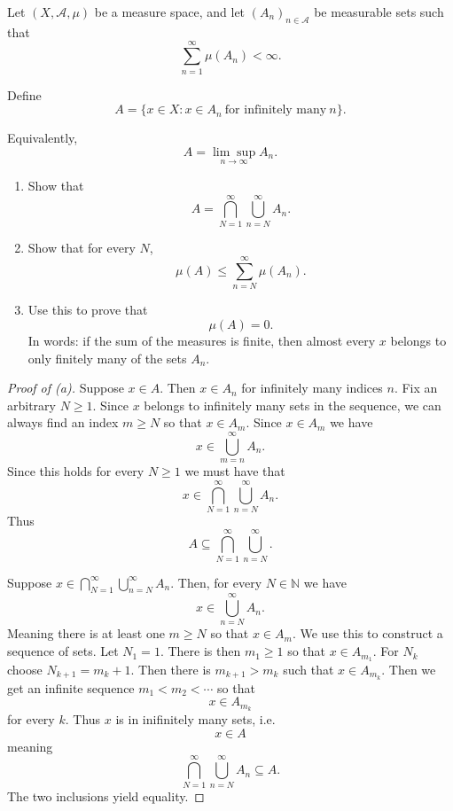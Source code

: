 \begin{prob}
    Let $(X,\mathcal A, \mu)$ be a measure space, and let 
    $(A_n)_{n\in\mathcal A}$ be measurable sets such that 
    \[
        \sum_{n=1}^\infty \mu(A_n) < \infty.
    \]
    
    Define 
    \[
        A = \{x \in X : x \in A_n \ \text{for infinitely many} \ 
        n\}.
    \]

    Equivalently, 
    \[
        A = \underset{n\to\infty}{\lim\sup}A_n.
    \]

    \begin{enumerate}[label=\alph*)]
        \item Show that 
            \[
                A = \bigcap_{N=1}^\infty\bigcup_{n=N}^\infty A_n.
            \]
        \item Show that for every $N$, 
            \[
                \mu(A) \leq \sum_{n=N}^\infty \mu(A_n).
            \]
        \item Use this to prove that 
            \[
                \mu(A) = 0.
            \] 
            In words: if the sum of the measures is finite, then 
            almost every $x$ belongs to only finitely many of 
            the sets $A_n$.
    \end{enumerate}
\end{prob}
\begin{proof}[Proof of (a)]
    Suppose $x \in A$. Then $x \in A_n$ for infinitely many 
    indices $n$. Fix an arbitrary $N \geq 1$. Since $x$ belongs 
    to infinitely many sets in the sequence, we can always find 
    an index $m \geq N$ so that $x \in A_m$.
    Since $x \in A_m$ we have 
    \[
        x \in \bigcup_{m=n}^\infty A_n.
    \]
    Since this holds for every $N \geq 1$ we must have that 
    \[
        x \in \bigcap_{N=1}^\infty \bigcup_{n=N}^\infty A_n.
    \]
    Thus 
    \[
        A \subseteq \bigcap_{N=1}^\infty \bigcup_{n=N}^\infty. 
    \]

    Suppose $x \in \bigcap_{N=1}^\infty \bigcup_{n=N}^\infty A_n$. 
    Then, for every $N \in \mathbb N$ we have 
    \[
        x \in \bigcup_{n=N}^\infty A_n.  
    \]
    Meaning there is at least one $m \geq N$ so that $x \in A_m$. 
    We use this to construct a sequence of sets. Let 
    $N_1 = 1$. There is then $m_1 \geq 1$ so that $x \in A_{m_1}$. 
    For $N_k$ choose $N_{k+1} = m_{k} + 1$. Then there is 
    $m_{k+1} > m_k$ such that $x \in A_{m_k}$. Then we 
    get an infinite sequence $m_1 < m_2 < \cdots$ so that 
    \[
        x \in A_{m_k} 
    \]
    for every $k$. Thus $x$ is in inifinitely many sets, i.e. 
    \[
        x \in A
    \]
    meaning 
    \[
        \bigcap_{N=1}^\infty \bigcup_{n=N}^\infty A_n \subseteq 
        A. 
    \]
    The two inclusions yield equality. 

\end{proof}
